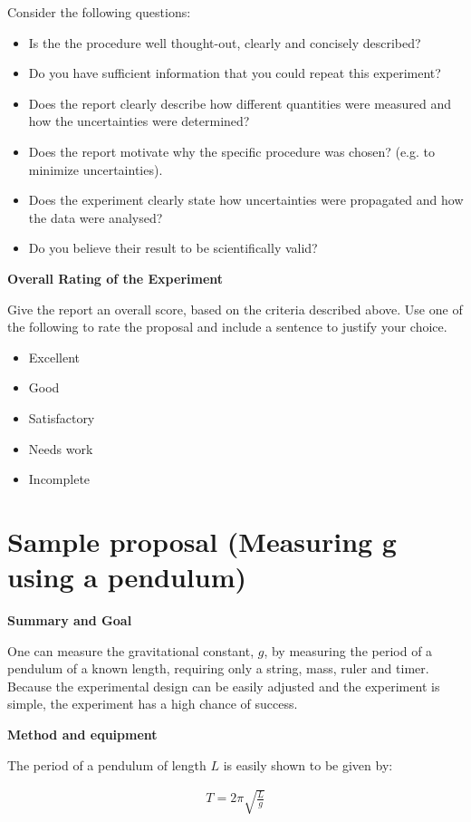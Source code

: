 Consider the following questions:
\begin{itemize}
\item Is the the procedure well thought-out, clearly and concisely described? 
\item Do you have sufficient information that you could repeat this experiment?
\item Does the report clearly describe how different quantities were measured and how the uncertainties were determined?
\item Does the report motivate why the specific procedure was chosen? (e.g. to minimize uncertainties).
\item Does the experiment clearly state how uncertainties were propagated and how the data were analysed?
\item Do you believe their result to be scientifically valid?
\end{itemize}


\textbf{Overall Rating of the Experiment}

Give the report an overall score, based on the criteria described above. Use one of the following to rate the proposal and include a sentence to justify your choice.
\begin{itemize}
\item Excellent
\item Good
\item Satisfactory
\item Needs work
\item Incomplete
\end{itemize}

\newpage
\section{Sample proposal (Measuring g using a pendulum)}
 \vspace{0.25cm}
\textbf{Summary and Goal}

One can measure the gravitational constant, $g$, by measuring the period of a pendulum of a known length, requiring only a string, mass, ruler and timer. Because the experimental design can be easily adjusted and the experiment is simple, the experiment has a high chance of success.

\textbf{Method and equipment}

The period of a pendulum of length $L$ is easily shown to be given by:

\begin{align*}
T=2\pi \sqrt {\frac{L}{g}}
\end{align*}

